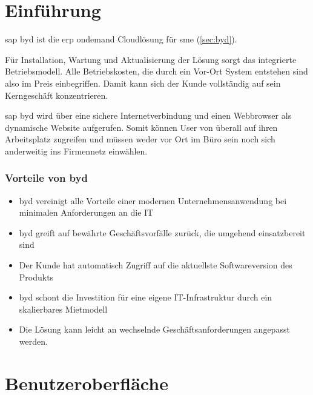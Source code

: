 \section{Einführung}

\gls{sap} \gls{byd} ist die \gls{erp} \gls{ondemand} Cloudlösung für \gls{sme} (\ref{sec:byd}).

Für Installation, Wartung und Aktualisierung der Lösung sorgt das integrierte Betriebsmodell. Alle Betriebskosten, die durch ein Vor-Ort System entstehen sind also im Preis einbegriffen. Damit kann sich der Kunde vollständig auf sein Kerngeschäft konzentrieren.

\gls{sap} \gls{byd} wird über eine sichere Internetverbindung und einen Webbrowser als dynamische Website aufgerufen. Somit können User von überall auf ihren Arbeitsplatz zugreifen und müssen weder vor Ort im Büro sein noch sich anderweitig ins Firmennetz einwählen.

\subsubsection{Vorteile von \gls{byd}}

\begin{itemize}
\item \gls{byd} vereinigt alle Vorteile einer modernen Unternehmensanwendung bei minimalen Anforderungen an die IT
\item \gls{byd} greift auf bewährte Geschäftsvorfälle zurück, die umgehend einsatzbereit sind
\item Der Kunde hat automatisch Zugriff auf die aktuellste Softwareversion des Produkts
\item \gls{byd} schont die Investition für eine eigene IT-Infrastruktur durch ein skalierbares Mietmodell
\item Die Lösung kann leicht an wechselnde Geschäftsanforderungen angepasst werden.
\end{itemize}
\cite{itelligence}

\section{Benutzeroberfläche}

